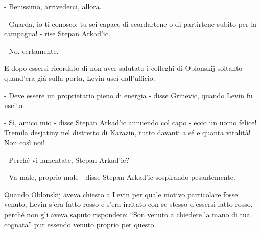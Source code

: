- Benissimo, arrivederci, allora. 

- Guarda, io ti conosco; tu sei capace di scordartene o di partirtene subito per la campagna! - rise Stepan Arkad'ic. 

- No, certamente. 

E dopo essersi ricordato di non aver salutato i colleghi di Oblonskij soltanto quand'era già sulla porta, Levin uscì dall'ufficio. 

- Deve essere un proprietario pieno di energia - disse Grinevic, quando Levin fu uscito. 

- Sì, amico mio - disse Stepan Arkad'ic annuendo col capo - ecco un uomo felice! Tremila desjatiny nel distretto di Karazin, tutto davanti a sé e quanta vitalità! Non così noi! 

- Perché vi lamentate, Stepan Arkad'ic? 

- Va male, proprio male - disse Stepan Arkad'ic sospirando pesantemente. 

Quando Oblonskij aveva chiesto a Levin per quale motivo particolare fosse venuto, Levin s'era fatto rosso e s'era irritato con se stesso d'essersi fatto rosso, perché non gli aveva saputo rispondere: ``Son venuto a chiedere la mano di tua cognata'' pur essendo venuto proprio per questo. 


